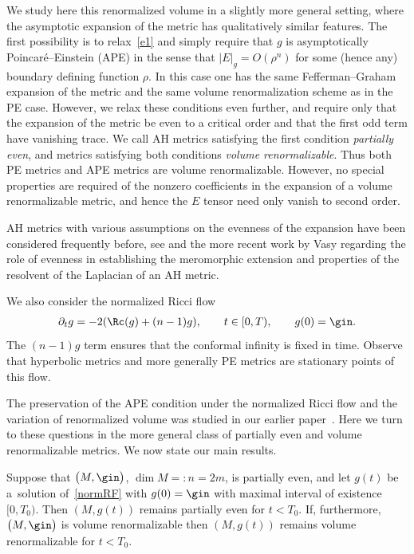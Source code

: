 We study here this renormalized volume in a slightly more general setting, where the asymptotic expansion of the metric
has qualitatively similar features. The first possibility is to relax~\eqref{e1} and simply require that $g$ is asymptotically
Poincar\'e--Einstein (APE) in the sense that $|E|_g = O(\rho^n)$ for some (hence any) boundary defining function $\rho$. In
this case one has the same Fefferman--Graham expansion of the metric and the same volume renormalization scheme as
in the PE case. However, we relax these conditions even further, and require only that the expansion of the metric be even
to a critical order and that the first odd term have vanishing trace. We call AH metrics satisfying the first condition {\it
partially even}, and metrics satisfying both conditions {\it volume renormalizable}. Thus both PE metrics and APE metrics are
volume renormalizable. However, no special properties are required of the nonzero coefficients in the expansion of
a volume renormalizable metric, and hence the $E$ tensor need only vanish to second order.

AH metrics with various assumptions on the evenness of the expansion have been considered frequently before,
see \cite{Guillarmou, MM} and the more recent work by Vasy \cite{V} regarding the role of evenness in establishing
the meromorphic extension and properties of the resolvent of the Laplacian of an AH metric.

We also consider the normalized Ricci flow
\begin{gather} \label{normRF}
\partial_t g = -2 ( \Rc(g) + (n-1)g ), \qquad t \in [0,T), \qquad g(0) = \gin.
\end{gather}
The $(n-1) g$ term ensures that the conformal infinity is fixed in time. Observe that hyperbolic metrics and more generally
PE metrics are stationary points of this flow.

The preservation of the APE condition under the normalized Ricci flow and the variation of renormalized volume was studied
in our earlier paper~\cite{BMW}. Here we turn to these questions in the more general class of partially even and volume renormalizable
metrics. We now state our main results.

\begin{Theorem}\label{TheoremA} Suppose that $\big(M,\gin\big)$, $\dim M =: n = 2m$, is partially even, and let $g(t)$ be a~solution of~\eqref{normRF} with $g(0) = \gin$
with maximal interval of existence $[0,T_0)$. Then $(M, g(t))$ remains partially even for $t < T_0$. If, furthermore, $\big(M,\gin\big)$ is volume renormalizable then $(M, g(t))$ remains volume renormalizable for $t < T_0$.
\end{Theorem}
